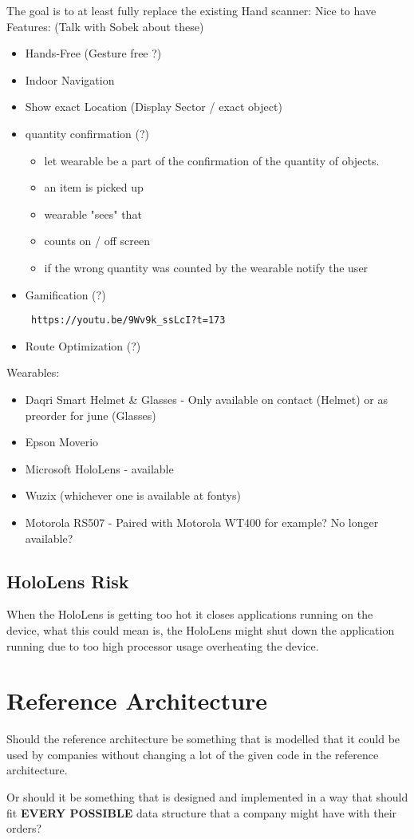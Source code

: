 \documentclass{report}
\begin{document}
The goal is to at least fully replace the existing Hand scanner:
Nice to have Features: (Talk with Sobek about these)
\begin{itemize}
	\item Hands-Free (Gesture free ?)
	\item Indoor Navigation
	\item Show exact Location (Display Sector / exact object)
	\item quantity confirmation (?)
	\begin{itemize}
		\item let wearable be a part of the confirmation of the quantity of objects.
		\item an item is picked up
		\item wearable "sees" that
		\item counts on / off screen
		\item if the wrong quantity was counted by the wearable notify the user
	\end{itemize}
	\item Gamification (?) \begin{verbatim} https://youtu.be/9Wv9k_ssLcI?t=173 \end{verbatim}
	\item Route Optimization (?)
\end{itemize}

Wearables:
\begin{itemize}
	\item Daqri Smart Helmet \& Glasses - Only available on contact (Helmet) or as preorder for june (Glasses)
	\item Epson Moverio
	\item Microsoft HoloLens - available
	\item Wuzix (whichever one is available at fontys)
	\item Motorola RS507 - Paired with Motorola WT400 for example? No longer available?
\end{itemize}

\section{HoloLens Risk}
When the HoloLens is getting too hot it closes applications running on the device, what this could mean is, the HoloLens might shut down the application running due to too high processor usage overheating the device.

\chapter{Reference Architecture}
Should the reference architecture be something that is modelled that it could be used by companies without changing a lot of the given code in the reference architecture. 

Or should it be something that is designed and implemented in a way that should fit \textbf{EVERY POSSIBLE} data structure that a company might have with their orders?
\end{document}

